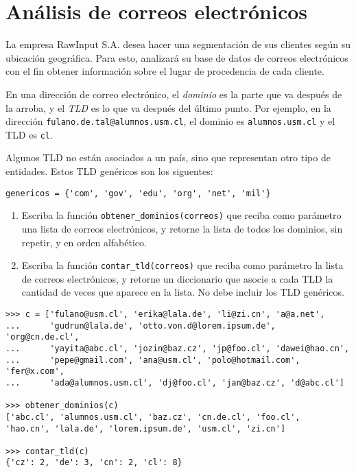 \section{Análisis de correos electrónicos}

La empresa RawInput S.A. desea hacer una segmentación de sus clientes
según su ubicación geográfica. Para esto, analizará su base de datos de
correos electrónicos con el fin obtener información sobre el lugar de
procedencia de cada cliente.

En una dirección de correo electrónico, el \emph{dominio} es la parte
que va después de la arroba, y el \emph{TLD} es lo que va después del
último punto. Por ejemplo, en la dirección
\lstinline!fulano.de.tal@alumnos.usm.cl!, el dominio es
\lstinline!alumnos.usm.cl! y el TLD es \lstinline!cl!.

Algunos TLD no están asociados a un país, sino que representan otro tipo
de entidades. Estos TLD genéricos son los siguentes:

\begin{lstlisting}
genericos = {'com', 'gov', 'edu', 'org', 'net', 'mil'}
\end{lstlisting}

\begin{enumerate}
\item
  Escriba la función \lstinline!obtener_dominios(correos)! que reciba
  como parámetro una lista de correos electrónicos, y retorne la lista
  de todos los dominios, sin repetir, y en orden alfabético.
\item
  Escriba la función \lstinline!contar_tld(correos)! que reciba como
  parámetro la lista de correos electrónicos, y retorne un diccionario
  que asocie a cada TLD la cantidad de veces que aparece en la lista. No
  debe incluir los TLD genéricos.
\end{enumerate}

\begin{lstlisting}
>>> c = ['fulano@usm.cl', 'erika@lala.de', 'li@zi.cn', 'a@a.net',
...      'gudrun@lala.de', 'otto.von.d@lorem.ipsum.de', 'org@cn.de.cl',
...      'yayita@abc.cl', 'jozin@baz.cz', 'jp@foo.cl', 'dawei@hao.cn',
...      'pepe@gmail.com', 'ana@usm.cl', 'polo@hotmail.com', 'fer@x.com',
...      'ada@alumnos.usm.cl', 'dj@foo.cl', 'jan@baz.cz', 'd@abc.cl']

>>> obtener_dominios(c)
['abc.cl', 'alumnos.usm.cl', 'baz.cz', 'cn.de.cl', 'foo.cl',
'hao.cn', 'lala.de', 'lorem.ipsum.de', 'usm.cl', 'zi.cn']

>>> contar_tld(c)
{'cz': 2, 'de': 3, 'cn': 2, 'cl': 8}
\end{lstlisting}

